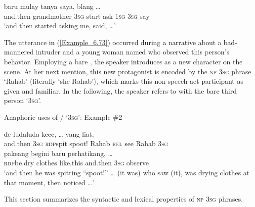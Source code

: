  \gll baru      mulay  tanya  saya,    blang  {\ldots}\\
 and.then  grandmother  \textsc{3sg}  start  ask  \textsc{1sg}  \textsc{3sg}  say  \\
\glt
‘and then  started asking me,  said, {\ldots}’ \textstyleExampleSource{[080918-001-CvNP.0056-0057]}
\z


The utterance in (\ref{Example_6.73}) occurred during a narrative about a bad-mannered intruder and a young woman named  who observed this person’s behavior. Employing a bare , the speaker introduces  as a new character on the scene. At her next mention, this new protagonist is encoded by the \textsc{np} \textsc{3sg}  phrase  ‘Rahab’ (literally ‘she Rahab’), which marks this non-speech-act participant as given and familiar. In the following, the speaker refers to  with the bare third person   ‘\textsc{3sg}’.



\begin{styleExampleTitle}
Anaphoric uses of / ‘\textsc{3sg}’: Example \#2
\end{styleExampleTitle}

\ea
\label{Example_6.73}
 {{de}} {{luda{\Tilde}luda}} {keee,} {{\ldots}} {{}} {{yang}} {liat,} {{}} {}\\ %
 and.then  {\textsc{3sg}}  {\textsc{rdp}{\Tilde}spit}  spoot!  {}  {Rahab}  {\textsc{rel}}  see  {Rahab}  \textsc{3sg}\\
  {pakeang}  {begini}  {baru}  {}  {perhatikang,}  {\ldots}\\
 {\textsc{rdp}{\Tilde}be.dry}  {clothes}  {like.this}  {and.then}  {\textsc{3sg}}  {observe}  {}\\
 ‘and then he was spitting ``spoot!'' {\ldots} (it was)  who saw (it),  was drying clothes at that moment, then  noticed {\ldots}’ \textstyleExampleSource{[081006-035-CvEx.0042]}
\z



This section summarizes the syntactic and lexical properties of \textsc{np} \textsc{3sg}  phrases.



